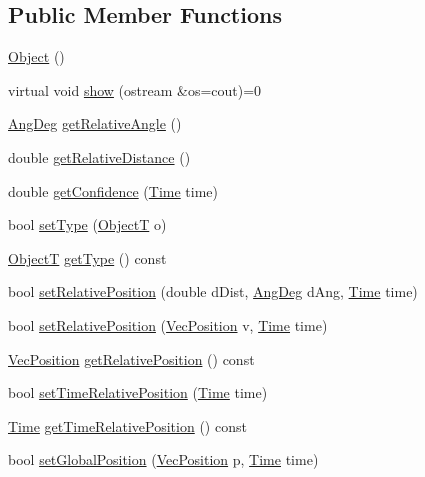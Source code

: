 \subsection*{Public Member Functions}
\begin{DoxyCompactItemize}
\item 
\hyperlink{classObject_a40860402e64d8008fb42329df7097cdb}{Object} ()
\item 
virtual void \hyperlink{classObject_abdfad2372e7ec5f9aa271a1677653778}{show} (ostream \&os=cout)=0
\item 
\hyperlink{Geometry_8h_a6bfe02ae9bb185092902092561ab2865}{Ang\+Deg} \hyperlink{classObject_a28709fc5998f7f24f3aa32a9dfcd1e42}{get\+Relative\+Angle} ()
\item 
double \hyperlink{classObject_af111de23285de9a9e29f7c7fae6401b6}{get\+Relative\+Distance} ()
\item 
double \hyperlink{classObject_ac2d82f3b7d82f5098095ff83f4af597b}{get\+Confidence} (\hyperlink{classTime}{Time} time)
\item 
bool \hyperlink{classObject_aec36935819c3c4f5050d73a3f2ebbfdb}{set\+Type} (\hyperlink{SoccerTypes_8h_ad4b701fa66e7d26c054ed15b7820c77c}{ObjectT} o)
\item 
\hyperlink{SoccerTypes_8h_ad4b701fa66e7d26c054ed15b7820c77c}{ObjectT} \hyperlink{classObject_a16cba98d16d802e6858a3aee946f7231}{get\+Type} () const 
\item 
bool \hyperlink{classObject_aa31b35b9ee29ee5886e164d19ba461b4}{set\+Relative\+Position} (double d\+Dist, \hyperlink{Geometry_8h_a6bfe02ae9bb185092902092561ab2865}{Ang\+Deg} d\+Ang, \hyperlink{classTime}{Time} time)
\item 
bool \hyperlink{classObject_a1d0f80823f4b2c077a3d91d8ba2b8851}{set\+Relative\+Position} (\hyperlink{classVecPosition}{Vec\+Position} v, \hyperlink{classTime}{Time} time)
\item 
\hyperlink{classVecPosition}{Vec\+Position} \hyperlink{classObject_ac7ecab5852daef8614add5422eb36838}{get\+Relative\+Position} () const 
\item 
bool \hyperlink{classObject_a71656669e4ba8fb84363a33c375c7a83}{set\+Time\+Relative\+Position} (\hyperlink{classTime}{Time} time)
\item 
\hyperlink{classTime}{Time} \hyperlink{classObject_a83fc6b5fe56b15472b9d072bd6cc197b}{get\+Time\+Relative\+Position} () const 
\item 
bool \hyperlink{classObject_aef89da7e4ec7a846b056b8739c486ca4}{set\+Global\+Position} (\hyperlink{classVecPosition}{Vec\+Position} p, \hyperlink{classTime}{Time} time)

\end{DoxyCompactItemize}
